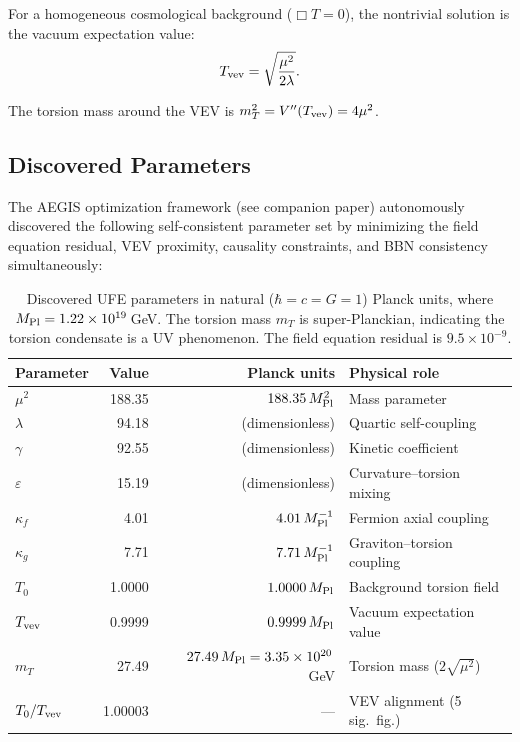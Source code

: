 \documentclass[12pt,preprint]{aastex631}
\newcommand{\Mpl}{M_{\rm Pl}}
\newcommand{\Tvev}{T_{\rm vev}}
\newcommand{\Tzero}{T_0}
\begin{document}
For a homogeneous cosmological background ($\Box T = 0$),
the nontrivial solution is the vacuum expectation value:
\begin{equation}
\label{eq:vev}
  \Tvev = \sqrt{\frac{\mu^2}{2\lambda}}.
\end{equation}

The torsion mass around the VEV is $m_T^2 = V''(\Tvev) = 4\mu^2$.

\subsection{Discovered Parameters}

The AEGIS optimization framework (see companion paper) autonomously
discovered the following self-consistent parameter set by minimizing
the field equation residual, VEV proximity, causality constraints,
and BBN consistency simultaneously:

\begin{table}[h]
\centering
\begin{tabular}{lrrl}
\hline
Parameter & Value & Planck units & Physical role \\
\hline
$\mu^2$      & 188.35     & $188.35\,\Mpl^2$ & Mass parameter \\
$\lambda$    & 94.18      & (dimensionless)   & Quartic self-coupling \\
$\gamma$     & 92.55      & (dimensionless)   & Kinetic coefficient \\
$\varepsilon$& 15.19      & (dimensionless)   & Curvature--torsion mixing \\
$\kappa_f$   & 4.01       & $4.01\,\Mpl^{-1}$ & Fermion axial coupling \\
$\kappa_g$   & 7.71       & $7.71\,\Mpl^{-1}$ & Graviton--torsion coupling \\
\hline
$\Tzero$     & 1.0000     & $1.0000\,\Mpl$    & Background torsion field \\
$\Tvev$      & 0.9999     & $0.9999\,\Mpl$    & Vacuum expectation value \\
$m_T$        & 27.49      & $27.49\,\Mpl = 3.35 \times 10^{20}$\,GeV & Torsion mass ($2\sqrt{\mu^2}$) \\
$\Tzero/\Tvev$ & 1.00003  & ---               & VEV alignment (5 sig.\ fig.) \\
\hline
\end{tabular}
\caption{Discovered UFE parameters in natural ($\hbar = c = G = 1$)
Planck units, where $\Mpl = 1.22 \times 10^{19}$\,GeV. The torsion
mass $m_T$ is super-Planckian, indicating the torsion condensate is
a UV phenomenon. The field equation residual is $9.5 \times 10^{-9}$.}
\label{tab:params}
\end{table}
\end{document}
